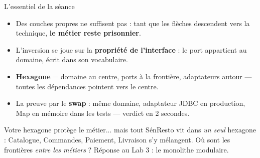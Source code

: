 \documentclass[aspectratio=169,11pt]{beamer}
\begin{document}
\begin{frame}{L'essentiel de la séance}
\begin{ucadret}[À retenir]
{\footnotesize
\begin{itemize}
  \item Des couches propres ne suffisent pas : tant que les flèches descendent vers la technique, \textbf{le métier reste prisonnier}.
  \item L'inversion se joue sur la \textbf{propriété de l'interface} : le port appartient au domaine, écrit dans son vocabulaire.
  \item \textbf{Hexagone} = domaine au centre, ports à la frontière, adaptateurs autour — toutes les dépendances pointent vers le centre.
  \item La preuve par le \textbf{swap} : même domaine, adaptateur JDBC en production, Map en mémoire dans les tests — verdict en 2 secondes.
\end{itemize}}
\end{ucadret}
\begin{ucadfront}
{\footnotesize Votre hexagone protège le métier... mais tout SénResto vit dans \emph{un seul} hexagone : Catalogue, Commandes, Paiement, Livraison s'y mélangent. Où sont les frontières \emph{entre les métiers} ? Réponse au Lab 3 : le monolithe modulaire.}
\end{ucadfront}
\end{frame}
\end{document}
